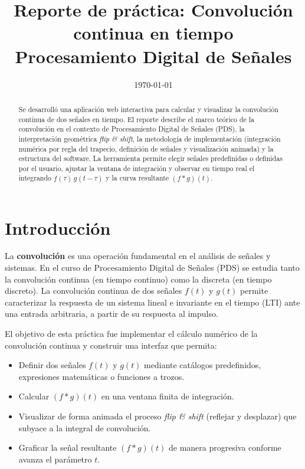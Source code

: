 \documentclass[12pt,a4paper]{article}
\title{\textbf{Reporte de práctica: Convolución continua en tiempo}\\[0.5em]
\large Procesamiento Digital de Señales}
\date{\today}
\begin{document}
\maketitle

\begin{abstract}
Se desarrolló una aplicación web interactiva para calcular y visualizar la convolución continua de dos señales en tiempo. El reporte describe el marco teórico de la convolución en el contexto de Procesamiento Digital de Señales (PDS), la interpretación geométrica \emph{flip \& shift}, la metodología de implementación (integración numérica por regla del trapecio, definición de señales y visualización animada) y la estructura del software. La herramienta permite elegir señales predefinidas o definidas por el usuario, ajustar la ventana de integración y observar en tiempo real el integrando \(f(\tau)\,g(t-\tau)\) y la curva resultante \((f*g)(t)\).
\end{abstract}

\tableofcontents
\newpage

\section{Introducción}

La \textbf{convolución} es una operación fundamental en el análisis de señales y sistemas. En el curso de Procesamiento Digital de Señales (PDS) se estudia tanto la convolución continua (en tiempo continuo) como la discreta (en tiempo discreto). La convolución continua de dos señales \(f(t)\) y \(g(t)\) permite caracterizar la respuesta de un sistema lineal e invariante en el tiempo (LTI) ante una entrada arbitraria, a partir de su respuesta al impulso.

El objetivo de esta práctica fue implementar el cálculo numérico de la convolución continua y construir una interfaz que permita:
\begin{itemize}[noitemsep]
  \item Definir dos señales \(f(t)\) y \(g(t)\) mediante catálogos predefinidos, expresiones matemáticas o funciones a trozos.
  \item Calcular \((f*g)(t)\) en una ventana finita de integración.
  \item Visualizar de forma animada el proceso \emph{flip \& shift} (reflejar y desplazar) que subyace a la integral de convolución.
  \item Graficar la señal resultante \((f*g)(t)\) de manera progresiva conforme avanza el parámetro \(t\).
\end{itemize}
\end{document}
